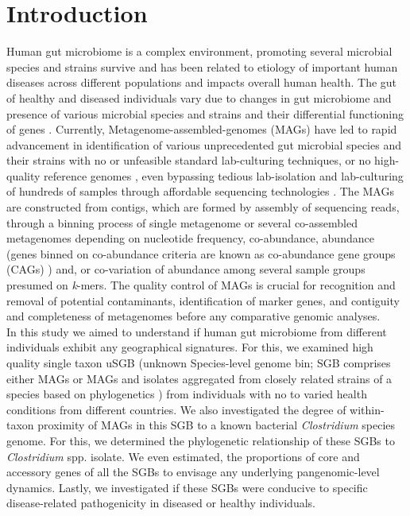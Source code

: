 \documentclass[11pt]{article}
\begin{document}
\section{Introduction} 
Human gut microbiome is a complex environment, promoting several microbial species and strains survive and has been related to etiology of important human diseases across different populations and impacts overall human health\cite{Nayfach_2019, Armour2019}. The gut of healthy and diseased individuals vary due to changes in gut microbiome and presence of various microbial species and strains and their differential functioning of genes \cite{Armour2019}. Currently, Metagenome-assembled-genomes (MAGs) have led to rapid advancement in identification of various unprecedented gut microbial species and their strains with no or unfeasible standard lab-culturing techniques, or no high-quality reference genomes \cite{Jin2022}, even bypassing tedious lab-isolation and lab-culturing of hundreds of samples \cite{Watson2021.04.02.438222, Nayfach_2019} through affordable sequencing technologies \cite{Asnicar2020}. The MAGs are constructed from contigs, which are formed by assembly of sequencing reads, through a binning process of single metagenome or several co-assembled metagenomes depending on nucleotide frequency, co-abundance, abundance (genes binned on co-abundance criteria are known as co-abundance gene groups (CAGs) \cite{Nielsen2014}) and, or co-variation of abundance among several sample groups \cite{Nayfach_2019} presumed on \textit{k}-mers\cite{Setubal2021}. The quality control of MAGs is crucial for recognition and removal of potential contaminants, identification of marker genes, and contiguity and completeness of metagenomes\cite{Nayfach_2019} before any comparative genomic analyses.\\
In this study we aimed to understand if human gut microbiome from different individuals exhibit any geographical signatures. For this, we examined high quality single taxon uSGB (unknown Species-level genome bin; SGB comprises either MAGs or MAGs and isolates aggregated from closely related strains of a species based on phylogenetics \cite{Asnicar2020}) from individuals with no to varied health conditions from different countries. We also investigated the degree of within-taxon proximity of MAGs in this SGB to a known bacterial \textit{Clostridium} species genome. For this, we determined the phylogenetic relationship of these SGBs to \textit{Clostridium} spp. isolate. We even estimated, the proportions of core and accessory genes of all the SGBs to envisage any underlying pangenomic-level dynamics. Lastly, we investigated if these SGBs were conducive to specific disease-related pathogenicity in diseased or healthy individuals.   
\end{document}
